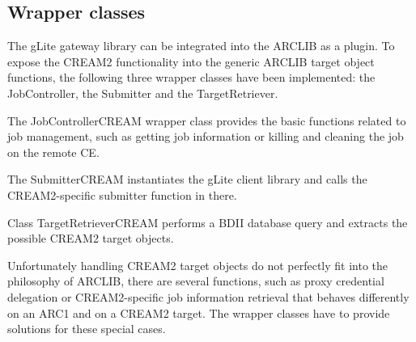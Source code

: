 \documentclass{article}
\begin{document}
\subsection{Wrapper classes}
\label{Wrapper classes}
The gLite gateway library can be integrated into the ARCLIB as a plugin. To expose the CREAM2 functionality into the generic ARCLIB target object functions, the following three wrapper classes have been implemented: the JobController, the Submitter and the TargetRetriever.\par
The JobControllerCREAM wrapper class provides the basic functions related to job management, such as getting job information or killing and cleaning the job on the remote CE.\par
The SubmitterCREAM instantiates the gLite client library and calls the CREAM2-specific submitter function in there.\par
Class TargetRetrieverCREAM performs a BDII database query and extracts the possible CREAM2 target objects.\par
Unfortunately handling CREAM2 target objects do not perfectly fit into the philosophy of ARCLIB, there are several functions, such as proxy credential delegation or CREAM2-specific job information retrieval that behaves differently on an ARC1 and on a CREAM2 target. The wrapper classes have to provide solutions for these special cases.
\end{document}
